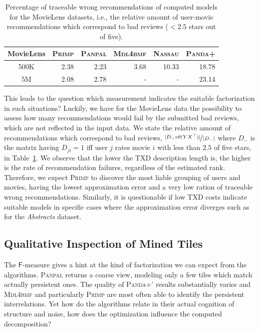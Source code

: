 \begin{table}%
	\centering
	\begin{tabular}{crrrrr}\toprule
    MovieLens & \textsc{Primp} & \textsc{Panpal} & \textsc{Mdl4bmf} & \textsc{Nassau} & \textsc{Panda+}\\ 
    \midrule
    500K & 2.38 & 2.23 &3.68 & 10.33 & 18.78\\
    5M   & 2.08 & 2.78 &-&-&23.14\\
    \bottomrule
    \end{tabular}
    \caption{Percentage of traceable wrong recommendations of computed models for the MovieLens datasets, i.e., the relative amount of user-movie recommendations which correspond to bad reviews ($<2.5$ stars out of five).}
    \label{tbl:FP}
\end{table}

This leads to the question which measurement indicates the suitable factorization in such situations? Luckily, we have for the MovieLens data the possibility to assess how many recommendations would fail by the submitted bad reviews, which are not reflected in the input data. We state the relative amount of recommendations which correspond to bad reviews, $\nicefrac{\lvert D_-\circ \theta(YX^\top )\rvert  }{\lvert  D_-\rvert  }$ where $D_-$ is the matrix having $D_{ji}=1$ iff user $j$ rates movie $i$ with less than $2.5$ of five stars, in Table~\ref{tbl:FP}. We observe that the lower the TXD description length is, the higher is the rate of recommendation failures, regardless of the estimated rank.  Therefore, we expect \textsc{Primp} to discover the most liable grouping of users and movies, having the lowest approximation error and a very low ration of traceable wrong recommendations. Similarly, it is questionable if low TXD costs indicate suitable models in specific cases where the approximation error diverges such as for the \textit{Abstracts} dataset.
\subsection{Qualitative Inspection of Mined Tiles}\label{sec:MDL:qualitativeExp} 
The $\mathsf{F}$-measure gives a hint at the kind of factorization we can expect from the algorithms. \textsc{Panpal} returns a coarse view, modeling only a few tiles which match actually persistent ones. The quality of \textsc{Panda+}' results substantially varies and \textsc{Mdl4bmf} and particularly \textsc{Primp} are most often able to identify the persistent interrelations. Yet how do the algorithms relate in their actual cognition of structure and noise, how does the optimization influence the computed decomposition?

